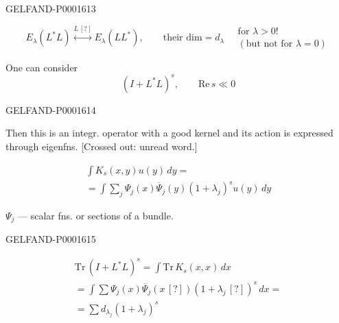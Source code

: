 \begin{GelfandAdjacentEvidence}{GELFAND-P000161}{3}

\begin{equation*}
E_\lambda (L^*L)\overset{L\, [?]}{\longleftrightarrow}E_\lambda (LL^*),\qquad
\text{their }\mathrm{dim}=d_\lambda\quad
\substack{\text{for }\lambda>0!\\(\text{but not for }\lambda=0)}
\end{equation*}
\end{GelfandAdjacentEvidence}


One can consider
\begin{equation*}
(I+L^*L)^s,\qquad \mathrm{Re}\, s\ll0
\end{equation*}

\begin{GelfandAdjacentEvidence}{GELFAND-P000161}{4}

Then this is an integr. operator with a good kernel and its action is expressed through eigenfns.
[Crossed out: unread word.]
\end{GelfandAdjacentEvidence}

\begin{gather*}
\int K_s (x, y)u (y)\, dy=\\
=\int\sum_j\Psi_j (x)\overline{\Psi}_j (y)(1+\lambda_j)^s u (y)\, dy
\end{gather*}

$\Psi_j$ --- scalar fns. or sections of a bundle.

\begin{GelfandAdjacentEvidence}{GELFAND-P000161}{5}

\begin{gather*}
\mathrm{Tr}\,(I+L^*L)^s=\int\mathrm{Tr}\, K_s (x, x)\, dx\\
=\int\sum\Psi_j (x)\overline{\Psi}_j (x\, [?])(1+\lambda_j\, [?])^s\, dx=\\
=\sum d_{\lambda_j}(1+\lambda_j)^s
\end{gather*}
\end{GelfandAdjacentEvidence}



